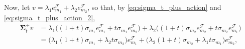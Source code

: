 \documentclass[twoside,11pt]{book}
\begin{document}
Now, let $v = \lambda_{1} e_{m_{1}}^{\mathcal{F}} + \lambda_{2} e_{m_{2}}^{\mathcal{F}}$, so that, by \eqref{eq:sigma_t_plus_action} and \eqref{eq:sigma_t_plus_action_2},
\begin{align}
\bm{\Sigma}_{t}^{+} v & = \lambda_{1} \bigg((1+t) \sigma_{m_{1}} e_{m_{1}}^{\mathcal{F}} + t \sigma_{m_{1}}  e_{m_{2}}^{\mathcal{F}} \bigg) + \lambda_{2} \bigg((1+t) \sigma_{m_{2}} e_{m_{2}}^{\mathcal{F}}  + t \sigma_{m_{2}}  e_{m_{1}}^{\mathcal{F}} \bigg) \nonumber \\
\label{eq:sigma_t_plus_action_v}
& = \bigg( \lambda_{1} (1+t) \sigma_{m_{1}} + \lambda_{2} t \sigma_{m_{2}} \bigg) e_{m_{1}}^{\mathcal{F}} + \bigg( \lambda_{2} (1+t) \sigma_{m_{2}} + \lambda_{1}t\sigma_{m_{1}} \bigg) e_{m_{2}} ^{\mathcal{F}},
\end{align}
\end{document}
